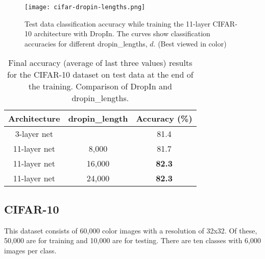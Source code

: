 \documentclass[10pt,twocolumn,letterpaper]{article}
\newcommand{\dropin}{DropIn }
\newcommand{\dropinNS}{DropIn}
\begin{document}
\begin{figure}[tb]
\begin{center}
   \texttt{[image: cifar-dropin-lengths.png]}
\end{center}
  \vspace{-10pt}
   \caption{Test data classification accuracy while training the 11-layer CIFAR-10 architecture with \dropinNS. The curves show classification accuracies for different dropin\_lengths, $d$. (Best viewed in color)  
}
\label{fig:cifarDropinLen}
  \vspace{-5pt}
\end{figure}


\begin{table}[tb]
\begin{center}
  \begin{tabular}{| c | c | c |}
    \hline
    Architecture & dropin\_length & Accuracy (\%) \\ \hline \hline
   3-layer net &     & 81.4 \\ \hline
   11-layer net & 8,000  & 81.7 \\ \hline
   11-layer net & 16,000  & \textbf{82.3} \\ \hline
   11-layer net & 24,000  & \textbf{82.3} \\ \hline
  \end{tabular}
  \caption{Final accuracy (average of last three values) results for the CIFAR-10 dataset on test data at the end of the training.  Comparison of \dropin and dropin\_lengths. }
  \label{tab:cifarLengths}
\end{center}
  \vspace{-20pt}
\end{table}




\subsection{CIFAR-10} \label{sec:cifar}

This dataset consists of 60,000 color images with a resolution of 32x32.
Of these, 50,000 are for training and 10,000 are for testing.
There are ten classes with 6,000 images per class. 
\end{document}
